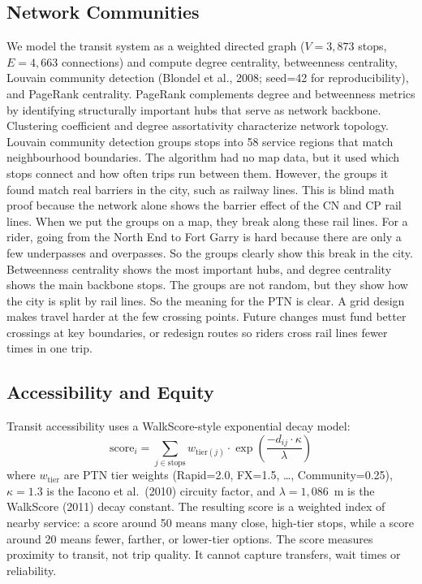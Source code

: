 \documentclass[11pt]{article}
\begin{document}
\subsection{Network Communities}

We model the transit system as a weighted directed graph ($V=3{,}873$ stops, $E = 4{,}663$ connections) and compute degree centrality, betweenness centrality, Louvain community detection (Blondel et al., 2008; seed=42 for reproducibility), and PageRank centrality. PageRank complements degree and betweenness metrics by identifying structurally important hubs that serve as network backbone. Clustering coefficient and degree assortativity characterize network topology. Louvain community detection groups stops into 58 service regions that match neighbourhood boundaries. The algorithm had no map data, but it used which stops connect and how often trips run between them. However, the groups it found match real barriers in the city, such as railway lines. This is blind math proof because the network alone shows the barrier effect of the CN and CP rail lines. When we put the groups on a map, they break along these rail lines. For a rider, going from the North End to Fort Garry is hard because there are only a few underpasses and overpasses. So the groups clearly show this break in the city. Betweenness centrality shows the most important hubs, and degree centrality shows the main backbone stops. The groups are not random, but they show how the city is split by rail lines. So the meaning for the PTN is clear. A grid design makes travel harder at the few crossing points. Future changes must fund better crossings at key boundaries, or redesign routes so riders cross rail lines fewer times in one trip.

\subsection{Accessibility and Equity}

Transit accessibility uses a WalkScore-style exponential decay model:
\begin{equation}
\text{score}_i = \sum_{j \in \text{stops}} w_{\text{tier}(j)} \cdot \exp\!\left(\frac{-d_{ij} \cdot \kappa}{\lambda}\right)
\label{eq:walkscore}
\end{equation}
where $w_{\text{tier}}$ are PTN tier weights (Rapid=2.0, FX=1.5, \ldots, Community=0.25), $\kappa=1.3$ is the Iacono et al.\ (2010) circuity factor, and $\lambda=1{,}086$~m is the WalkScore (2011) decay constant. The resulting score is a weighted index of nearby service: a score around 50 means many close, high-tier stops, while a score around 20 means fewer, farther, or lower-tier options. The score measures proximity to transit, not trip quality. It cannot capture transfers, wait times or reliability.
\end{document}
